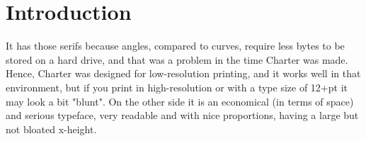 \chapter{Introduction}

It has those serifs because angles, compared to curves, require less bytes to be stored on a hard drive, and that was a problem in the time Charter was made. Hence, Charter was designed for low-resolution printing, and it works well in that environment, but if you print in high-resolution or with a type size of 12+pt it may look a bit "blunt".
On the other side it is an economical (in terms of space) and serious typeface, very readable and with nice proportions, having a large but not bloated x-height.

